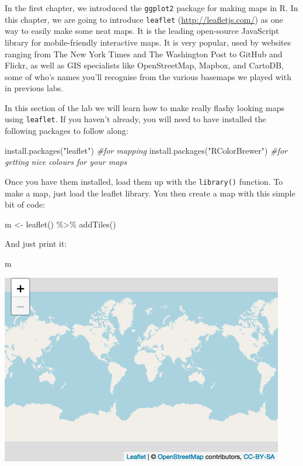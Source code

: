\documentclass[
  krantz2]{krantz}
\makeatletter
\newenvironment{Shaded}{\begin{snugshade}}{\end{snugshade}}
\newcommand{\CommentTok}[1]{\textcolor[rgb]{0.37,0.37,0.37}{\textit{#1}}}
\newcommand{\FunctionTok}[1]{\textcolor[rgb]{0,0,0}{#1}}
\newcommand{\NormalTok}[1]{#1}
\newcommand{\OtherTok}[1]{\textcolor[rgb]{0.37,0.37,0.37}{#1}}
\newcommand{\SpecialCharTok}[1]{\textcolor[rgb]{0,0,0}{#1}}
\newcommand{\StringTok}[1]{\textcolor[rgb]{0.5,0.5,0.5}{#1}}
\newenvironment{kframe}{%
\medskip{}
\setlength{\fboxsep}{.8em}
 \def\at@end@of@kframe{}%
 \ifinner\ifhmode%
  \def\at@end@of@kframe{\end{minipage}}%
  \begin{minipage}{\columnwidth}%
 \fi\fi%
 \def\FrameCommand##1{\hskip\@totalleftmargin \hskip-\fboxsep
 \colorbox{shadecolor}{##1}\hskip-\fboxsep
     \hskip-\linewidth \hskip-\@totalleftmargin \hskip\columnwidth}%
 \MakeFramed {\advance\hsize-\width
   \@totalleftmargin\z@ \linewidth\hsize
   \@setminipage}}%
 {\par\unskip\endMakeFramed%
 \at@end@of@kframe}
\renewenvironment{Shaded}{\begin{kframe}}{\end{kframe}}
\makeatother
\begin{document}
In the first chapter, we introduced the \texttt{ggplot2} package for making maps in R. In this chapter, we are going to introduce \texttt{leaflet} (\url{http://leafletjs.com/}) as one way to easily make some neat maps. It is the leading open-source JavaScript library for mobile-friendly interactive maps. It is very popular, used by websites ranging from The New York Times and The Washington Post to GitHub and Flickr, as well as GIS specialists like OpenStreetMap, Mapbox, and CartoDB, some of who's names you'll recognise from the various basemaps we played with in previous labs.

In this section of the lab we will learn how to make really flashy looking maps using \texttt{leaflet}. If you haven't already, you will need to have installed the following packages to follow along:

\begin{Shaded}
\begin{Highlighting}[]
\FunctionTok{install.packages}\NormalTok{(}\StringTok{"leaflet"}\NormalTok{) }\CommentTok{\#for mapping}
\FunctionTok{install.packages}\NormalTok{(}\StringTok{"RColorBrewer"}\NormalTok{) }\CommentTok{\#for getting nice colours for your maps}
\end{Highlighting}
\end{Shaded}

Once you have them installed, load them up with the \texttt{library()} function. To make a map, just load the leaflet library. You then create a map with this simple bit of code:

\begin{Shaded}
\begin{Highlighting}[]
\NormalTok{m }\OtherTok{\textless{}{-}} \FunctionTok{leaflet}\NormalTok{() }\SpecialCharTok{\%\textgreater{}\%} \FunctionTok{addTiles}\NormalTok{()  }
\end{Highlighting}
\end{Shaded}

And just print it:

\begin{Shaded}
\begin{Highlighting}[]
\NormalTok{m  }
\end{Highlighting}
\end{Shaded}

\includegraphics{crime_mapping_files/figure-latex/unnamed-chunk-48-1.png}
\end{document}
